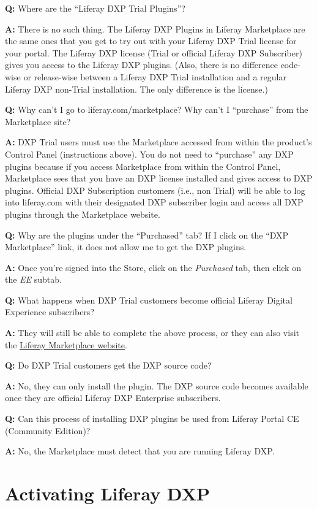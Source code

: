 \textbf{Q:} Where are the ``Liferay DXP Trial Plugins''?

\textbf{A:} There is no such thing. The Liferay DXP Plugins in Liferay
Marketplace are the same ones that you get to try out with your Liferay
DXP Trial license for your portal. The Liferay DXP license (Trial or
official Liferay DXP Subscriber) gives you access to the Liferay DXP
plugins. (Also, there is no difference code-wise or release-wise between
a Liferay DXP Trial installation and a regular Liferay DXP non-Trial
installation. The only difference is the license.)

\textbf{Q:} Why can't I go to liferay.com/marketplace? Why can't I
``purchase'' from the Marketplace site?

\textbf{A:} DXP Trial users must use the Marketplace accessed from
within the product's Control Panel (instructions above). You do not need
to ``purchase'' any DXP plugins because if you access Marketplace from
within the Control Panel, Marketplace sees that you have an DXP license
installed and gives access to DXP plugins. Official DXP Subscription
customers (i.e., non Trial) will be able to log into liferay.com with
their designated DXP subscriber login and access all DXP plugins through
the Marketplace website.

\textbf{Q:} Why are the plugins under the ``Purchased'' tab? If I click
on the ``DXP Marketplace'' link, it does not allow me to get the DXP
plugins.

\textbf{A:} Once you're signed into the Store, click on the
\emph{Purchased} tab, then click on the \emph{EE} subtab.

\textbf{Q:} What happens when DXP Trial customers become official
Liferay Digital Experience subscribers?

\textbf{A:} They will still be able to complete the above process, or
they can also visit the
\href{https://www.liferay.com/marketplace}{Liferay Marketplace website}.

\textbf{Q:} Do DXP Trial customers get the DXP source code?

\textbf{A:} No, they can only install the plugin. The DXP source code
becomes available once they are official Liferay DXP Enterprise
subscribers.

\textbf{Q:} Can this process of installing DXP plugins be used from
Liferay Portal CE (Community Edition)?

\textbf{A:} No, the Marketplace must detect that you are running Liferay
DXP.

\section{Activating Liferay DXP}\label{activating-liferay-dxp}

